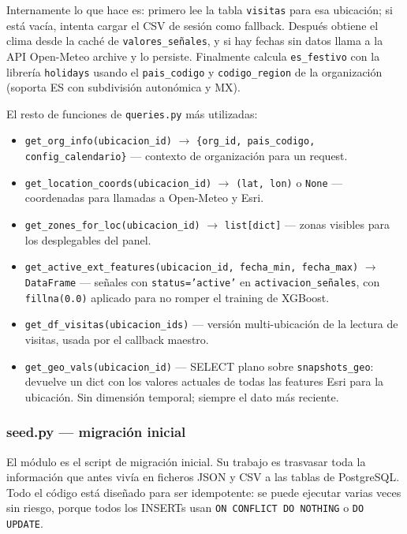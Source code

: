 \documentclass[12pt, a4paper]{article}
\begin{document}
Internamente lo que hace es: primero lee la tabla \texttt{visitas} para esa ubicación; si está vacía, intenta cargar el CSV de sesión como fallback. Después obtiene el clima desde la caché de \texttt{valores\_señales}, y si hay fechas sin datos llama a la API Open-Meteo archive y lo persiste. Finalmente calcula \texttt{es\_festivo} con la librería \texttt{holidays} usando el \texttt{pais\_codigo} y \texttt{codigo\_region} de la organización (soporta ES con subdivisión autonómica y MX).

El resto de funciones de \texttt{queries.py} más utilizadas:

\begin{itemize}
  \item \texttt{get\_org\_info(ubicacion\_id)} $\rightarrow$ \texttt{\{org\_id, pais\_codigo, config\_calendario\}} — contexto de organización para un request.
  \item \texttt{get\_location\_coords(ubicacion\_id)} $\rightarrow$ \texttt{(lat, lon)} o \texttt{None} — coordenadas para llamadas a Open-Meteo y Esri.
  \item \texttt{get\_zones\_for\_loc(ubicacion\_id)} $\rightarrow$ \texttt{list[dict]} — zonas visibles para los desplegables del panel.
  \item \texttt{get\_active\_ext\_features(ubicacion\_id, fecha\_min, fecha\_max)} $\rightarrow$ \texttt{DataFrame} — señales con \texttt{status='active'} en \texttt{activacion\_señales}, con \texttt{fillna(0.0)} aplicado para no romper el training de XGBoost.
  \item \texttt{get\_df\_visitas(ubicacion\_ids)} — versión multi-ubicación de la lectura de visitas, usada por el callback maestro.
  \item \texttt{get\_geo\_vals(ubicacion\_id)} — SELECT plano sobre \texttt{snapshots\_geo}: devuelve un dict con los valores actuales de todas las features Esri para la ubicación. Sin dimensión temporal; siempre el dato más reciente.
\end{itemize}

\subsubsection{seed.py — migración inicial}

El módulo  es el script de migración inicial. Su trabajo es trasvasar toda la información que antes vivía en ficheros JSON y CSV a las tablas de PostgreSQL. Todo el código está diseñado para ser idempotente: se puede ejecutar varias veces sin riesgo, porque todos los INSERTs usan \texttt{ON CONFLICT DO NOTHING} o \texttt{DO UPDATE}.
\end{document}
